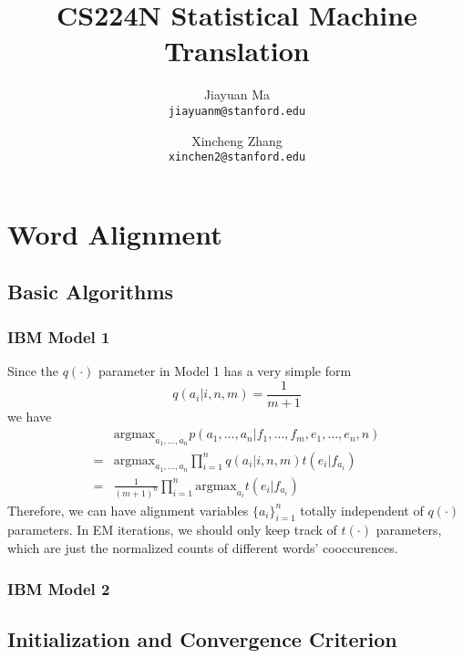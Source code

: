 \documentclass[letterpaper]{article}
\begin{document}
\title{CS224N Statistical Machine Translation}
\author{
	Jiayuan Ma \\
	\texttt{jiayuanm@stanford.edu}
	\and
	Xincheng Zhang\\
	\texttt{xinchen2@stanford.edu}
}
\maketitle

\section{Word Alignment}

\subsection{Basic Algorithms}

\subsubsection{IBM Model 1}
Since the $q(\cdot)$ parameter in Model 1 has a very simple form
\begin{equation}
q(a_i | i, n, m) = \frac{1}{m+1}
\end{equation}
we have
\begin{equation}
\begin{split}
& \textrm{argmax}_{a_1, \dots, a_n}
p(a_1, \dots, a_n | f_1, \dots, f_m, e_1, \dots, e_n, n) \\
= & \textrm{argmax}_{a_1, \dots, a_n}
\prod_{i=1}^n q(a_i | i, n, m) t(e_i | f_{a_i}) \\
= & \frac{1}{(m+1)^n} \prod_{i=1}^n \textrm{argmax}_{a_i}  t(e_i | f_{a_i})
\end{split}
\end{equation}
Therefore, we can have alignment variables $\{ a_i \}_{i=1}^n$ totally independent of $q(\cdot)$ parameters.
In EM iterations, we should only keep track of $t(\cdot)$ parameters, which are just the normalized counts of different words' cooccurences.


\subsubsection{IBM Model 2}



\subsection{Initialization and Convergence Criterion}
\end{document}
